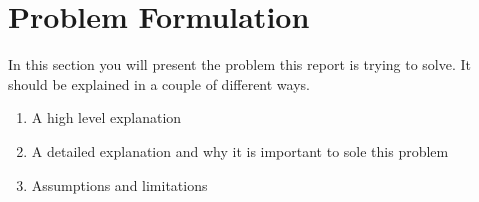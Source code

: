 



\section{Problem Formulation}

In this section you will present the problem this report is trying to solve. It should be explained in a couple of different ways.
\begin{enumerate}
    \item A high level explanation
    \item A detailed explanation and why it is important to sole this problem
    \item Assumptions and limitations
\end{enumerate}